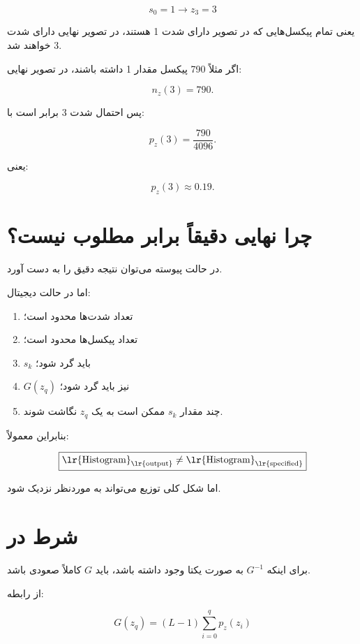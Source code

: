 \documentclass[12pt,a4paper]{article}
\begin{document}
	\[
	\boxed{
		s_0=1\rightarrow z_3=3
	}
	\]
	
	یعنی تمام پیکسل‌هایی که در تصویر  دارای شدت 1 هستند،
	در تصویر نهایی دارای شدت 3 خواهند شد.
	
	اگر مثلاً 790 پیکسل مقدار 1 داشته باشند، در تصویر نهایی:
	
	\[
	n_z(3)=790.
	\]
	
	پس احتمال شدت 3 برابر است با:
	
	\[
	p_z(3)
	=
	\frac{790}{4096}.
	\]
	
	یعنی:
	
	\[
	\boxed{
		p_z(3)\approx0.19.
	}
	\]
	
	
	\section{چرا  نهایی دقیقاً برابر  مطلوب نیست؟}
	
	در حالت پیوسته می‌توان نتیجه دقیق را به دست آورد.
	
	اما در حالت دیجیتال:
	
	\begin{enumerate}
		\item تعداد شدت‌ها محدود است؛
		\item تعداد پیکسل‌ها محدود است؛
		\item $s_k$ باید گرد شود؛
		\item $G(z_q)$ نیز باید گرد شود؛
		\item چند مقدار $s_k$ ممکن است به یک $z_q$ نگاشت شوند.
	\end{enumerate}
	
	بنابراین معمولاً:
	
	\[
	\boxed{
		\text{\lr{Histogram}}_{\text{\lr{output}}}
		\ne
		\text{\lr{Histogram}}_{\text{\lr{specified}}}
	}
	\]
	
	اما شکل کلی توزیع می‌تواند به  موردنظر نزدیک شود.
	
	
	\section{شرط  در }
	
	برای اینکه $G^{-1}$ به صورت یکتا وجود داشته باشد، باید $G$ کاملاً
	صعودی باشد.
	
	از رابطه:
	
	\[
	G(z_q)
	=
	(L-1)
	\sum_{i=0}^{q}p_z(z_i)
	\]
	
\end{document}
